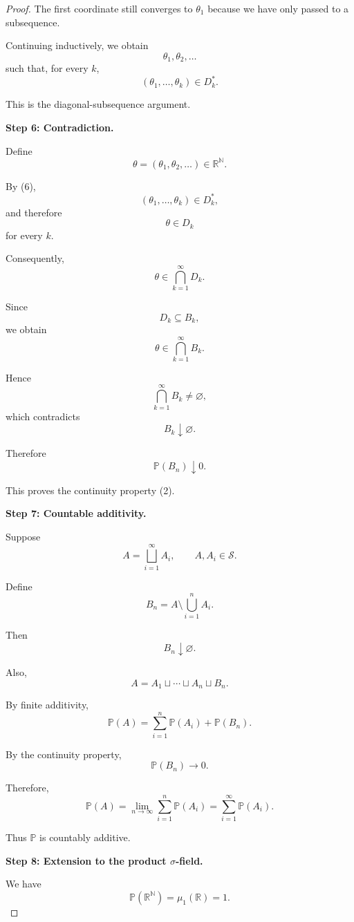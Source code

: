 \begin{proof}
The first coordinate still converges to $\theta_1$ because we have
only passed to a subsequence.

Continuing inductively, we obtain
\[
\theta_1,\theta_2,\ldots
\]
such that, for every $k$,
\[
\boxed{
(\theta_1,\ldots,\theta_k)\in D_k^*.
}
\tag{6}
\]

This is the diagonal-subsequence argument.

\medskip
\noindent
\textbf{Step 6: Contradiction.}

Define
\[
\theta
=
(\theta_1,\theta_2,\ldots)
\in\mathbb{R}^{\mathbb{N}}.
\]

By (6),
\[
(\theta_1,\ldots,\theta_k)\in D_k^*,
\]
and therefore
\[
\theta\in D_k
\]
for every $k$.

Consequently,
\[
\theta\in
\bigcap_{k=1}^{\infty}D_k.
\]

Since
\[
D_k\subseteq B_k,
\]
we obtain
\[
\theta\in
\bigcap_{k=1}^{\infty}B_k.
\]

Hence
\[
\bigcap_{k=1}^{\infty}B_k\neq\varnothing,
\]
which contradicts
\[
B_k\downarrow\varnothing.
\]

Therefore
\[
\mathbb{P}(B_n)\downarrow0.
\]

This proves the continuity property (2).

\medskip
\noindent
\textbf{Step 7: Countable additivity.}

Suppose
\[
A=\bigsqcup_{i=1}^{\infty}A_i,
\qquad
A,A_i\in\mathcal{S}.
\]

Define
\[
B_n
=
A\setminus\bigcup_{i=1}^nA_i.
\]

Then
\[
B_n\downarrow\varnothing.
\]

Also,
\[
A
=
A_1\sqcup\cdots\sqcup A_n\sqcup B_n.
\]

By finite additivity,
\[
\mathbb{P}(A)
=
\sum_{i=1}^n\mathbb{P}(A_i)
+
\mathbb{P}(B_n).
\]

By the continuity property,
\[
\mathbb{P}(B_n)\longrightarrow0.
\]

Therefore,
\[
\mathbb{P}(A)
=
\lim_{n\to\infty}
\sum_{i=1}^n\mathbb{P}(A_i)
=
\sum_{i=1}^{\infty}\mathbb{P}(A_i).
\]

Thus $\mathbb{P}$ is countably additive.

\medskip
\noindent
\textbf{Step 8: Extension to the product $\sigma$-field.}

We have
\[
\mathbb{P}(\mathbb{R}^{\mathbb{N}})
=
\mu_1(\mathbb{R})
=
1.
\]


\end{proof}
